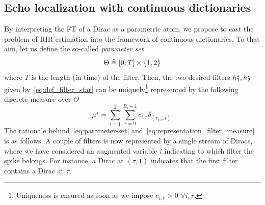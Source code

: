 \subsection{Echo localization with continuous dictionaries}




By interpreting the FT of a Dirac as a parametric atom, we propose to cast the problem of RIR estimation into the framework of continuous dictionaries.
To that aim, let us define the so-called \emph{parameter set}
\begin{equation}
    \label{eq:parameter-set}
    \Theta \triangleq \kintervcc{0}{T} \times \kbrace{1, 2}
\end{equation}
where $T$ is the length (in time) of the filter.
Then, the two desired filters  $h_1^\star,h_2^\star$ given  by~\eqref{eq:def_filter_star} can be uniquely\footnote{Uniqueness is ensured as soon as we impose $c_{i,r}>0$ $\forall i,r$.} represented by the following discrete measure over $\Theta$
\begin{equation}
    \label{eq:representation_filter_measure}
    \mu^\star = \sum_{i=1}^{2} \sum_{r=0}^{R_{i}-1} c_{i,r} \delta_{(\tau_{i,r}, i)}.
\end{equation}
The rationale behind~\eqref{eq:parameter-set}  and~\eqref{eq:representation_filter_measure} is as follows.
A couple of filters is now represented by a single stream of Diracs, where we have considered an augmented variable $i$ indicating to which filter the spike belongs.
For instance, a Dirac at $(\tau, 1)$ indicates that the first filter contains a Dirac at $\tau$.

